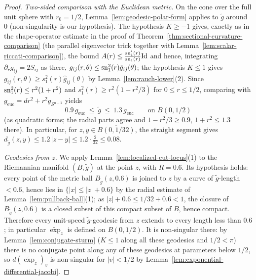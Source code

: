\begin{proof}
\sketch
{}
\emph{Two-sided comparison with the Euclidean metric.} On the cone
over the full unit sphere with $r_0=1/2$,
Lemma~\ref{lem:geodesic-polar-form} applies to $\tilde g$ around
$0$ (non-singularity is our hypothesis). The hypothesis $K\ge-1$
gives, exactly as in the shape-operator estimate in the proof of
Theorem~\ref{thm:sectional-curvature-comparison} (the parallel
eigenvector trick together with
Lemma~\ref{lem:scalar-riccati-comparison}), the bound $A(r)\le
\frac{\operatorname{sn}_1'(r)}{\operatorname{sn}_1(r)}\mathrm{Id}$ and hence, integrating
$\partial_rg_{ij}=2S_{ij}$ as there,
$g_{ij}(r,\theta)\le\operatorname{sn}_1^2(r)\hat g_{ij}(\theta)$; the hypothesis
$K\le1$ gives $g_{ij}(r,\theta)\ge s_1^2(r)\hat g_{ij}(\theta)$ by
Lemma~\ref{lem:rauch-lower}(2). Since
$\operatorname{sn}_1^2(r)\le r^2(1+r^2)$ and $s_1^2(r)\ge r^2(1-r^2/3)$ for
$0\le r\le 1/2$, comparing with
$g_{\mathrm{euc}}=dr^2+r^2g_{S^{n-1}}$ yields
\begin{equation}\label{twosided}
0.9\,g_{\mathrm{euc}}\ \le\ \tilde g\ \le\ 1.3\,g_{\mathrm{euc}}
\qquad\text{on }B(0,1/2)
\end{equation}
(as quadratic forms; the radial parts agree and
$1-r^2/3\ge0.9$, $1+r^2\le1.3$ there). In particular, for
$z,y\in\overline{B(0,1/32)}$, the straight segment gives
$d_{\tilde g}(z,y)\le1.2\,|z-y|\le1.2\cdot\tfrac{2}{32}\le0.08$.

\emph{Geodesics from $z$.} We apply
Lemma~\ref{lem:localized-cut-locus}(1) to the Riemannian manifold
$(B,\tilde g)$ at the point $z$, with $R=0.6$. Its hypothesis
holds: every point of the metric ball $B_{\tilde g}(z,0.6)$ is
joined to $z$ by a curve of $\tilde g$-length $<0.6$, hence lies
in $\{|x|\le|z|+0.6\}$ by the radial estimate of
Lemma~\ref{lem:pullback-ball}(1); as $|z|+0.6\le1/32+0.6<1$, the
closure of $B_{\tilde g}(z,0.6)$ is a closed subset of this
compact subset of $B$, hence compact. Therefore every unit-speed
$\tilde g$-geodesic from $z$ extends to every length less than
$0.6$; in particular $\widetilde\exp_z$ is defined on $B(0,1/2)$.
It is non-singular there: by Lemma~\ref{lem:conjugate-sturm}
($K\le1$ along all these geodesics and $1/2<\pi$) there is no
conjugate point along any of these geodesics at parameters
below $1/2$, so $d(\widetilde\exp_z)_v$ is non-singular for
$|v|<1/2$ by Lemma~\ref{lem:exponential-differential-jacobi}.


\end{proof}
